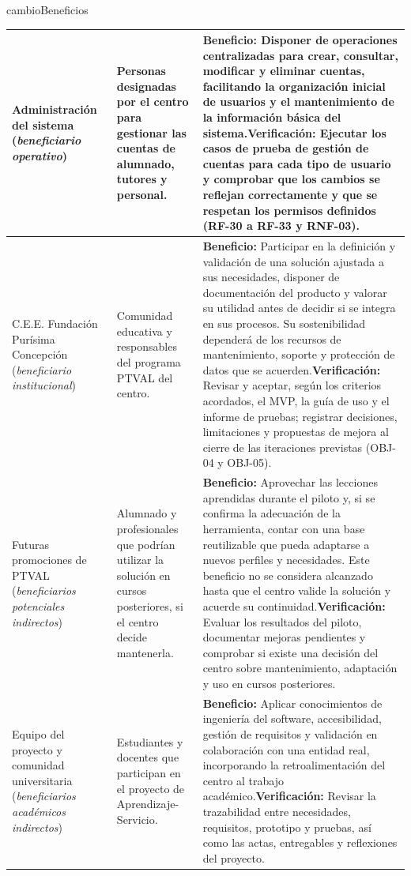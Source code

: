 \begin{cambiocontenido}{cambioBeneficios}
\begin{small}
\begin{longtable}{|>{\raggedright\arraybackslash}p{3.2cm}|>{\raggedright\arraybackslash}p{2.4cm}|>{\raggedright\arraybackslash}p{9.6cm}|}
Administración del sistema (\textit{beneficiario operativo}) & Personas designadas por el centro para gestionar las cuentas de alumnado, tutores y personal. & \textbf{Beneficio:} Disponer de operaciones centralizadas para crear, consultar, modificar y eliminar cuentas, facilitando la organización inicial de usuarios y el mantenimiento de la información básica del sistema.\newline \textbf{Verificación:} Ejecutar los casos de prueba de gestión de cuentas para cada tipo de usuario y comprobar que los cambios se reflejan correctamente y que se respetan los permisos definidos (RF-30 a RF-33 y RNF-03). \\
\hline
C.E.E. Fundación Purísima Concepción (\textit{beneficiario institucional}) & Comunidad educativa y responsables del programa PTVAL del centro. & \textbf{Beneficio:} Participar en la definición y validación de una solución ajustada a sus necesidades, disponer de documentación del producto y valorar su utilidad antes de decidir si se integra en sus procesos. Su sostenibilidad dependerá de los recursos de mantenimiento, soporte y protección de datos que se acuerden.\newline \textbf{Verificación:} Revisar y aceptar, según los criterios acordados, el MVP, la guía de uso y el informe de pruebas; registrar decisiones, limitaciones y propuestas de mejora al cierre de las iteraciones previstas (OBJ-04 y OBJ-05). \\
\hline
Futuras promociones de PTVAL (\textit{beneficiarios potenciales indirectos}) & Alumnado y profesionales que podrían utilizar la solución en cursos posteriores, si el centro decide mantenerla. & \textbf{Beneficio:} Aprovechar las lecciones aprendidas durante el piloto y, si se confirma la adecuación de la herramienta, contar con una base reutilizable que pueda adaptarse a nuevos perfiles y necesidades. Este beneficio no se considera alcanzado hasta que el centro valide la solución y acuerde su continuidad.\newline \textbf{Verificación:} Evaluar los resultados del piloto, documentar mejoras pendientes y comprobar si existe una decisión del centro sobre mantenimiento, adaptación y uso en cursos posteriores. \\
\hline
Equipo del proyecto y comunidad universitaria (\textit{beneficiarios académicos indirectos}) & Estudiantes y docentes que participan en el proyecto de Aprendizaje-Servicio. & \textbf{Beneficio:} Aplicar conocimientos de ingeniería del software, accesibilidad, gestión de requisitos y validación en colaboración con una entidad real, incorporando la retroalimentación del centro al trabajo académico.\newline \textbf{Verificación:} Revisar la trazabilidad entre necesidades, requisitos, prototipo y pruebas, así como las actas, entregables y reflexiones del proyecto. \\
\hline
\end{longtable}
\end{small}


\end{cambiocontenido}
